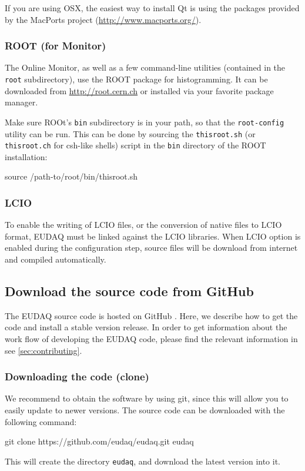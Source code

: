 If you are using OSX, the easiest way to install Qt is using the
packages provided by the MacPorts project (\url{http://www.macports.org/}).

\subsubsection{ROOT (for Monitor)}
\label{sec:Root}
The Online Monitor, as well as a few command-line utilities (contained in the \texttt{root} subdirectory), use the ROOT package for histogramming.
It can be downloaded from \url{http://root.cern.ch} or installed via
your favorite package manager.

Make sure ROOt's \texttt{bin} subdirectory is in your path, so that the \texttt{root-config} utility can be run.
This can be done by sourcing the \texttt{thisroot.sh} (or \texttt{thisroot.ch} for csh-like shells)
script in the \texttt{bin} directory of the ROOT installation:
\begin{listing}[mybash]
source /path-to/root/bin/thisroot.sh
\end{listing}

\subsubsection{LCIO}
\label{sec:LCIO-EUTel}
To enable the writing of \gls{LCIO} files, or the conversion of native files to \gls{LCIO} format,
EUDAQ must be linked against the \gls{LCIO} libraries.
When LCIO option is enabled during the configuration step, source files will be download from internet and compiled automatically.

\subsection{Download the source code from GitHub}
\label{sec:downloadingEUDAQ}

The EUDAQ source code is hosted on GitHub \cite{githubEUDAQ}. 
Here, we describe how to get the code and install a stable version release. 
In order to get information about the work flow of developing the EUDAQ code, please find the relevant information in see \autoref{sec:contributing}.

\subsubsection{Downloading the code (clone)}
We recommend to obtain the software by using git,
since this will allow you to easily update to newer versions.
The source code can be downloaded with the following command:
\begin{listing}[mybash]
git clone https://github.com/eudaq/eudaq.git eudaq
\end{listing}
This will create the directory \texttt{eudaq}, and download the latest
version into it. 

